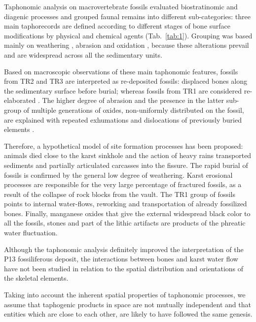 \documentclass[5p,authoryear]{elsarticle} %
\begin{document}
Taphonomic analysis \citep{Bagnus2011} on macrovertebrate fossils evaluated biostratinomic and diagenic processes and grouped faunal remains into different sub-categories: three main taphorecords \citep[TRs, \emph{sensu}][]{Fernandez-Lopez1987} are defined according to different stages of bone surface modifications by physical and chemical agents (Tab.~\ref{tab:1}). Grouping was based mainly on weathering \citep{Behrensmeyer1978,Diez1999,Kos2003,Torres2003}, abrasion \citep{Behrensmeyer1991} and oxidation \citep{Hill1982,Lopez-Gonzalez2006,White1976,White2009}, because these alterations prevail and are widespread across all the sedimentary units.

Based on macroscopic observations of these main taphonomic features, fossils from TR2 and TR3 are interpreted as re-deposited fossils: displaced bones along the sedimentary surface before burial; whereas fossils from TR1 are considered re-elaborated \citep[\emph{sensu}][]{Fernandez-Lopez1991,Fernandez-Lopez2007,Fernandez-Lopez2011}. The higher degree of abrasion and the presence in the latter sub-group of multiple generations of oxides, non-uniformly distributed on the fossil, are explained with repeated exhumations and dislocations of previously buried elements \citep{Lopez-Gonzalez2006}.

Therefore, a hypothetical model of site formation processes has been proposed: animals died close to the karst sinkhole and the action of heavy rains transported sediments and partially articulated carcasses into the fissure. The rapid burial of fossils is confirmed by the general low degree of weathering. Karst erosional processes are responsible for the very large percentage of fractured fossils, as a result of the collapse of rock blocks from the vault. The TR1 group of fossils points to internal water-flows, reworking and transportation of already fossilized bones. Finally, manganese oxides that give the external widespread black color to all the fossils, stones and part of the lithic artifacts are products of the phreatic water fluctuation.

Although the taphonomic analysis definitely improved the interpretation of the P13 fossiliferous deposit, the interactions between bones and karst water flow have not been studied in relation to the spatial distribution and orientations of the skeletal elements.

Taking into account the inherent spatial properties of taphonomic processes, we assume that taphogenic products \citep[\emph{sensu}][]{Fernandez-Lopez2000} in space are not mutually independent and that entities which are close to each other, are likely to have followed the same genesis.
\end{document}
